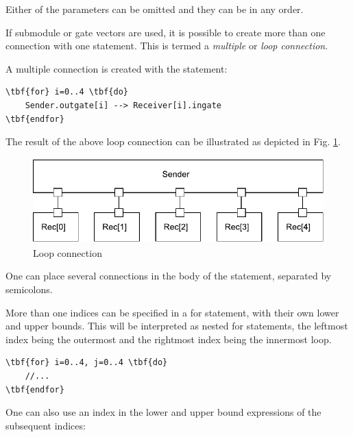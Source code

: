 Either of the parameters can be omitted and they can be in any 
order.




If submodule or gate vectors are used, it is possible to create 
more than one connection with one statement. This is termed a \textit{multiple} 
or \textit{loop connection}.

A multiple connection is created with the 
statement:

\begin{Verbatim}[commandchars=\\\{\}]
\tbf{for} i=0..4 \tbf{do}
    Sender.outgate[i] --> Receiver[i].ingate
\tbf{endfor}
\end{Verbatim}



The result of the above loop connection can be illustrated as 
depicted in Fig. \ref{fig:ch-ned-lang:loop-connection}.

\begin{figure}[htbp]
\begin{center}
\includegraphics[width=4.625in, height=1.297in]{figures/usmanFig7}
\caption{Loop connection}
\label{fig:ch-ned-lang:loop-connection}
\end{center}
\end{figure}


One can place several connections in the body of the
 statement, separated by semicolons.

More than one indices can be specified in a for statement, with their
own lower and upper bounds. This will be interpreted as nested for
statements, the leftmost index being
the outermost and the rightmost index being the innermost loop.


\begin{Verbatim}[commandchars=\\\{\}]
\tbf{for} i=0..4, j=0..4 \tbf{do}
    //...
\tbf{endfor}
\end{Verbatim}

One can also use an index in the lower and upper bound expressions 
of the subsequent indices:

